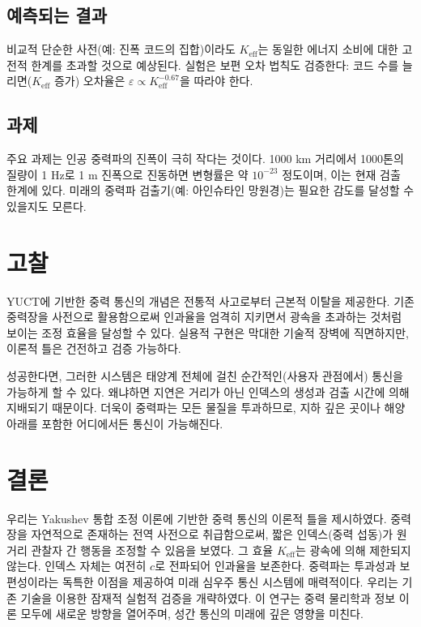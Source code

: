 \documentclass[12pt,a4paper]{article}
\newcommand{\Keff}{K_{\mathrm{eff}}}
\newcommand{\eps}{\varepsilon}
\begin{document}
	\subsection{예측되는 결과}
	
	비교적 단순한 사전(예: 진폭 코드의 집합)이라도 \(\Keff\)는 동일한 에너지 소비에 대한 고전적 한계를 초과할 것으로 예상된다. 실험은 보편 오차 법칙도 검증한다: 코드 수를 늘리면(\(\Keff\) 증가) 오차율은 \(\eps \propto \Keff^{-0.67}\)을 따라야 한다.
	
	\subsection{과제}
	
	주요 과제는 인공 중력파의 진폭이 극히 작다는 것이다. 1000 km 거리에서 1000톤의 질량이 1 Hz로 1 m 진폭으로 진동하면 변형률은 약 \(10^{-23}\) 정도이며, 이는 현재 검출 한계에 있다. 미래의 중력파 검출기(예: 아인슈타인 망원경)는 필요한 감도를 달성할 수 있을지도 모른다.
	
	\section{고찰}
	\label{sec:discussion}
	
	YUCT에 기반한 중력 통신의 개념은 전통적 사고로부터 근본적 이탈을 제공한다. 기존 중력장을 사전으로 활용함으로써 인과율을 엄격히 지키면서 광속을 초과하는 것처럼 보이는 조정 효율을 달성할 수 있다. 실용적 구현은 막대한 기술적 장벽에 직면하지만, 이론적 틀은 건전하고 검증 가능하다.
	
	성공한다면, 그러한 시스템은 태양계 전체에 걸친 순간적인(사용자 관점에서) 통신을 가능하게 할 수 있다. 왜냐하면 지연은 거리가 아닌 인덱스의 생성과 검출 시간에 의해 지배되기 때문이다. 더욱이 중력파는 모든 물질을 투과하므로, 지하 깊은 곳이나 해양 아래를 포함한 어디에서든 통신이 가능해진다.
	
	\section{결론}
	\label{sec:conclusion}
	
	우리는 Yakushev 통합 조정 이론에 기반한 중력 통신의 이론적 틀을 제시하였다. 중력장을 자연적으로 존재하는 전역 사전으로 취급함으로써, 짧은 인덱스(중력 섭동)가 원거리 관찰자 간 행동을 조정할 수 있음을 보였다. 그 효율 \(\Keff\)는 광속에 의해 제한되지 않는다. 인덱스 자체는 여전히 \(c\)로 전파되어 인과율을 보존한다. 중력파는 투과성과 보편성이라는 독특한 이점을 제공하여 미래 심우주 통신 시스템에 매력적이다. 우리는 기존 기술을 이용한 잠재적 실험적 검증을 개략하였다. 이 연구는 중력 물리학과 정보 이론 모두에 새로운 방향을 열어주며, 성간 통신의 미래에 깊은 영향을 미친다.
	
\end{document}
